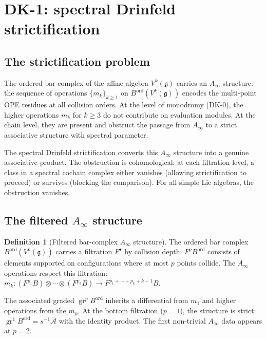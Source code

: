 \documentclass[11pt,reqno]{amsart}
\theoremstyle{definition}
\newtheorem{definition}[theorem]{Definition}
\theoremstyle{remark}
\newcommand{\cA}{\mathcal{A}}
\newcommand{\Ainf}{A_{\infty}}
\DeclareMathOperator{\gr}{gr}
\newcommand{\fg}{\mathfrak{g}}
\numberwithin{equation}{section}
\begin{document}
\section{DK-1: spectral Drinfeld strictification}
\label{sec:dk1}

\subsection{The strictification problem}

The ordered bar complex of the affine algebra $V^k(\fg)$
carries an $\Ainf$ structure: the sequence of operations
$\{m_k\}_{k \geq 1}$ on $B^{\mathrm{ord}}(V^k(\fg))$
encodes the multi-point OPE residues at all collision
orders.  At the level of monodromy (DK-0), the higher
operations $m_k$ for $k \geq 3$ do not contribute on
evaluation modules.  At the chain level, they are
present and obstruct the passage from $\Ainf$ to a
strict associative structure with spectral parameter.

The spectral Drinfeld strictification converts this
$\Ainf$ structure into a genuine associative product.
The obstruction is cohomological: at each filtration level,
a class in a spectral cochain complex either vanishes
(allowing strictification to proceed) or survives
(blocking the comparison).  For all simple Lie algebras,
the obstruction vanishes.

\subsection{The filtered $\Ainf$ structure}

\begin{definition}[Filtered bar-complex $\Ainf$ structure]
\label{def:dk-filtered-ainf}
The ordered bar complex $B^{\mathrm{ord}}(V^k(\fg))$
carries a filtration $F^\bullet$ by collision depth:
$F^p B^{\mathrm{ord}}$ consists of elements supported on
configurations where at most $p$ points collide.  The
$\Ainf$ operations respect this filtration:
$m_k \colon (F^{p_1} B) \otimes \cdots \otimes (F^{p_k} B)
\to F^{p_1 + \cdots + p_k + k - 1} B$.

The associated graded $\gr^p B^{\mathrm{ord}}$ inherits a
differential from $m_1$ and higher operations from the
$m_k$.  At the bottom filtration ($p = 1$), the structure is
strict: $\gr^1 B^{\mathrm{ord}} = s^{-1}\bar{\cA}$ with
the identity product.  The first non-trivial $\Ainf$ data
appears at $p = 2$.
\end{definition}
\end{document}
